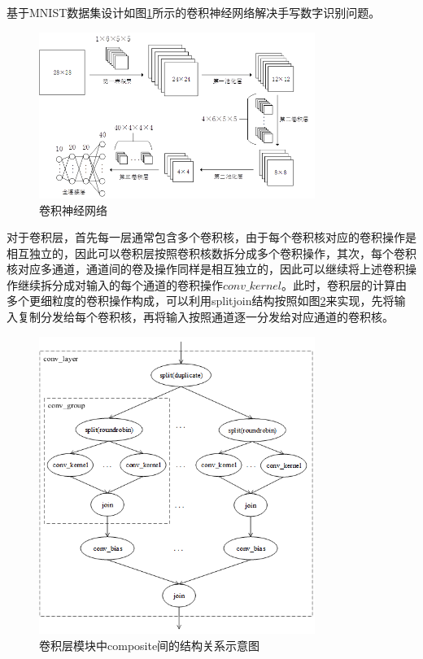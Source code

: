 基于MNIST数据集设计如图\ref{fig:cnn}所示的卷积神经网络解决手写数字识别问题。

\begin{figure}[!t]
\centering
\includegraphics[width=0.8\textwidth]{../img/Chap_Application/Yu/cnn.png}
\caption{卷积神经网络}
\label{fig:cnn}
\end{figure}

对于卷积层，首先每一层通常包含多个卷积核，由于每个卷积核对应的卷积操作是相互独立的，因此可以卷积层按照卷积核数拆分成多个卷积操作，其次，每个卷积核对应多通道，通道间的卷及操作同样是相互独立的，因此可以继续将上述卷积操作继续拆分成对输入的每个通道的卷积操作$conv\_kernel$。此时，卷积层的计算由多个更细粒度的卷积操作构成，可以利用splitjoin结构按照如图\ref{fig:cnn_conv_layer}来实现，先将输入复制分发给每个卷积核，再将输入按照通道逐一分发给对应通道的卷积核。
\begin{figure}[!t]
\centering
\includegraphics[width=0.8\textwidth]{../img/Chap_Application/Yu/cnn_conv_layer.png}
\caption{卷积层模块中composite间的结构关系示意图}
\label{fig:cnn_conv_layer}
\end{figure}

